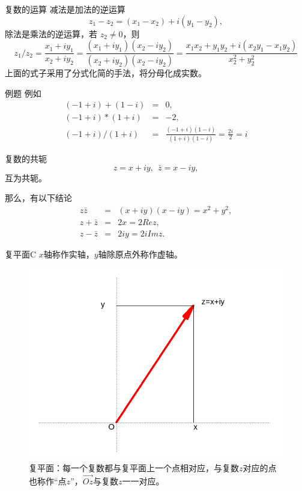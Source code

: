 \documentclass[11pt]{beamer}
\newcommand{\kong}[1][0.5]{\vspace{#1cm}}
\begin{document}
\begin{frame}{复数的运算}
减法是加法的逆运算
\begin{equation}
z_1 - z_2 = (x_1 - x_2) + i(y_1 - y_2),
\end{equation}
除法是乘法的逆运算，若 $z_2 \neq 0$，则
\begin{equation}
z_1 / z_2 = \frac{ x_1 + i y_1 }{ x_2 + i y_2} = \frac{ (x_1 + iy_1)(x_2 - i y_2) }{ (x_2+iy_2)(x_2 - iy_2) } = \frac{ x_1 x_2 + y_1 y_2 + i(x_2 y_1 - x_1 y_2) }{ x^2_2 + y^2_2}
\end{equation}
上面的式子采用了分式化简的手法，将分母化成实数。
\end{frame}

\begin{frame}{例题}
例如
\begin{eqnarray}
(-1 + i) + (1-i) &=& 0, \\
(-1 + i) * (1+i) &=& -2, \\
(-1 + i) / (1+i) &=& \frac{ (-1+i)(1-i) }{(1+i)(1-i)}
= \frac{ 2i }{2} = i
\end{eqnarray}

\end{frame}

\begin{frame}{复数的共轭}
\begin{equation}
z = x+iy, ~~ \bar{z} = x-iy,
\end{equation}
互为共轭。

\kong[0.5]

那么，有以下结论
\begin{eqnarray}
z \bar{z} &=& (x+iy)(x-iy) = x^2 + y^2, \\
z + \bar{z} &=& 2x = 2Re z, \\
z - \bar{z} &=& 2iy = 2i Im z.
\end{eqnarray}

\end{frame}

\begin{frame}{复平面C}
$x$轴称作实轴，$y$轴除原点外称作虚轴。
\begin{figure}
	\centering
	\includegraphics[width=0.7\linewidth]{chap1_01}
	\caption{复平面：每一个复数都与复平面上一个点相对应，与复数$z$对应的点也称作“点$z$”，$\vec{Oz}$与复数$z$一一对应。}
	\label{fig:chap1_01}
\end{figure}

\end{frame}
\end{document}
